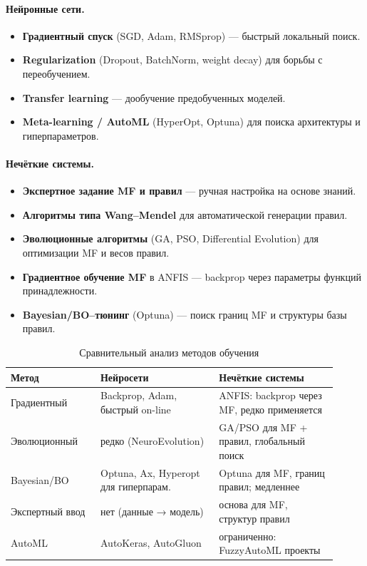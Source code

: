 \paragraph{Нейронные сети.}
\begin{itemize}
  \item \textbf{Градиентный спуск} (SGD, Adam, RMSprop) — быстрый локальный поиск.
  \item \textbf{Regularization} (Dropout, BatchNorm, weight decay) для борьбы с переобучением.
  \item \textbf{Transfer learning} — дообучение предобученных моделей.
  \item \textbf{Meta-learning / AutoML} (HyperOpt, Optuna) для поиска архитектуры и гиперпараметров.
\end{itemize}

\paragraph{Нечёткие системы.}
\begin{itemize}
  \item \textbf{Экспертное задание MF и правил} — ручная настройка на основе знаний.
  \item \textbf{Алгоритмы типа Wang–Mendel} \cite{Wang1992} для автоматической генерации правил.
  \item \textbf{Эволюционные алгоритмы} (GA, PSO, Differential Evolution) для оптимизации MF и весов правил.
  \item \textbf{Градиентное обучение MF} в ANFIS — backprop через параметры функций принадлежности.
  \item \textbf{Bayesian/BO–тюнинг} (Optuna) — поиск границ MF и структуры базы правил.
\end{itemize}

\begin{table}[H]
\centering\small
\caption{Сравнительный анализ методов обучения}
\begin{tabular}{@{}p{0.25\linewidth}p{0.33\linewidth}p{0.33\linewidth}@{}}
\toprule
\textbf{Метод} & \textbf{Нейросети} & \textbf{Нечёткие системы} \\ \midrule
Градиентный & 
Backprop, Adam, быстрый on-line & 
ANFIS: backprop через MF, редко применяется  \\[2pt]
Эволюционный & 
редко (NeuroEvolution) &
GA/PSO для MF + правил, глобальный поиск \\[2pt]
Bayesian/BO & 
Optuna, Ax, Hyperopt для гиперпарам. &
Optuna для MF, границ правил; медленнее \\[2pt]
Экспертный ввод & 
нет (данные → модель) &
основа для MF, структур правил \\[2pt]
AutoML & 
AutoKeras, AutoGluon &
ограниченно: FuzzyAutoML проекты \\ 
\bottomrule
\end{tabular}
\end{table}

